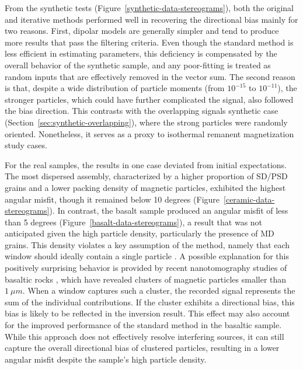 \documentclass[onecolumn,12pt,a4paper]{article}
\begin{document}
From the synthetic tests (Figure~\ref{synthetic-data-stereograms}), both the original \citep{Souza-Junior2024} and iterative methods performed well in recovering the directional bias mainly for two reasons. First, dipolar models are generally simpler and tend to produce more results that pass the filtering criteria. Even though the standard method is less efficient in estimating parameters, this deficiency is compensated by the overall behavior of the synthetic sample, and any poor-fitting is treated as random inputs that are effectively removed in the vector sum. The second reason is that, despite a wide distribution of particle moments (from \(10^{-15}\) to \(10^{-11}\)), the stronger particles, which could have further complicated the signal, also followed the bias direction. This contrasts with the overlapping signals synthetic case (Section~\ref{sec:synthetic-overlapping}), where the strong particles were randomly oriented. Nonetheless, it serves as a proxy to isothermal remanent magnetization study cases.


For the real samples, the results in one case deviated from initial expectations. The most dispersed assembly, characterized by a higher proportion of SD/PSD grains and a lower packing density of magnetic particles, exhibited the highest angular misfit, though it remained below 10 degrees (Figure~\ref{ceramic-data-stereograms}). In contrast, the basalt sample produced an angular misfit of less than 5 degrees (Figure~\ref{basalt-data-stereograms}), a result that was not anticipated given the high particle density, particularly the presence of MD grains. This density violates a key assumption of the method, namely that each window should ideally contain a single particle \citep{Souza-Junior2024}. A possible explanation for this positively surprising behavior is provided by recent nanotomography studies of basaltic rocks \citep[\textit{e.g.}][]{Out2024, Out2025}, which have revealed clusters of magnetic particles smaller than \(1~\mu m\). When a window captures such a cluster, the recorded signal represents the sum of the individual contributions. If the cluster exhibits a directional bias, this bias is likely to be reflected in the inversion result. This effect may also account for the improved performance of the standard method in the basaltic sample. While this approach does not effectively resolve interfering sources, it can still capture the overall directional bias of clustered particles, resulting in a lower angular misfit despite the sample’s high particle density.
\end{document}
